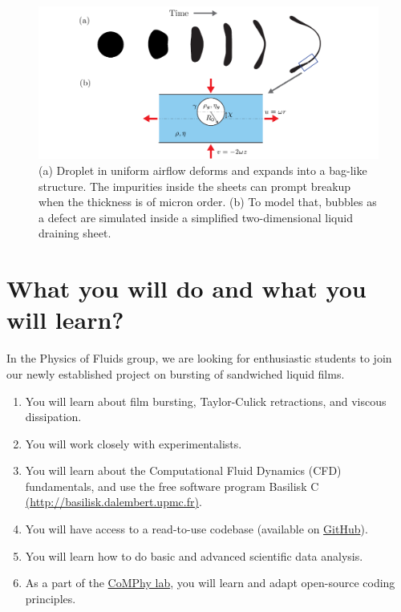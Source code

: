 \documentclass[a4paper,10pt]{article}
\begin{document}
\begin{figure}[h]
\centering
\includegraphics[width=\textwidth]{schematic_02.pdf}
\caption{(a) Droplet in uniform airflow deforms and expands into a bag-like structure. The impurities inside the sheets can prompt breakup when the thickness is of micron order. (b) To model that, bubbles as a defect are simulated inside a simplified two-dimensional liquid draining sheet.}
\label{fig:droplets2021}
\end{figure}

\section*{What you will do and what you will learn?}
In the Physics of Fluids group, we are looking for enthusiastic students to join our newly established project on bursting of sandwiched liquid films.

\begin{enumerate}
\item You will learn about film bursting, Taylor-Culick retractions, and viscous dissipation. 
\item You will work closely with experimentalists. 
\item You will learn about the Computational Fluid Dynamics (CFD) fundamentals, and use the free software program Basilisk C \href{http://basilisk.dalembert.upmc.fr}{(http://basilisk.dalembert.upmc.fr)}.
\item You will have access to a read-to-use codebase (available on \href{https://github.com/comphy-lab/bubbleinSheet}{GitHub}).
\item You will learn how to do basic and advanced scientific data analysis.
\item As a part of the \href{https://comphy-lab.org}{CoMPhy lab}, you will learn and adapt open-source coding principles. 
\end{enumerate}
\end{document}
